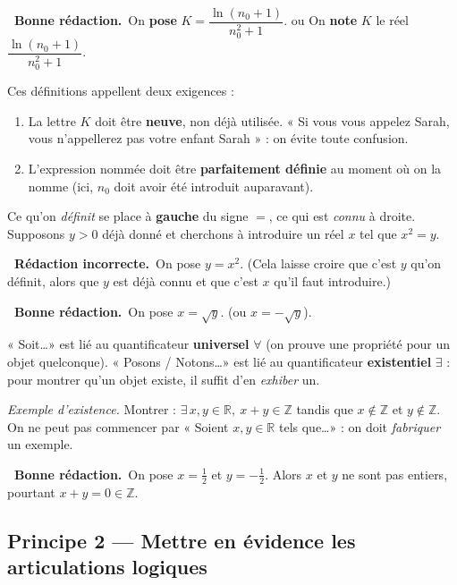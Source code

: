 \documentclass[11pt,a4paper]{article}
\newcommand{\ok}{\textcolor{METeal}{\textbf{\ding{51}\ \sffamily Bonne rédaction.}}\ }
\newcommand{\ko}{\textcolor{MECoral}{\textbf{\ding{55}\ \sffamily Rédaction incorrecte.}}\ }
\newcommand{\R}{\mathbb{R}}
\newcommand{\Z}{\mathbb{Z}}
\begin{document}
\begin{bonne}
\ok On \textbf{pose} $K=\dfrac{\ln(n_0+1)}{n_0^2+1}$. \qquad ou \qquad
On \textbf{note} $K$ le réel $\dfrac{\ln(n_0+1)}{n_0^2+1}$.
\end{bonne}

Ces définitions appellent deux exigences :
\begin{enumerate}
  \item La lettre $K$ doit être \textbf{neuve}, non déjà utilisée. « Si vous vous appelez
  Sarah, vous n'appellerez pas votre enfant Sarah » : on évite toute confusion.
  \item L'expression nommée doit être \textbf{parfaitement définie} au moment où on la nomme
  (ici, $n_0$ doit avoir été introduit auparavant).
\end{enumerate}

\begin{attention}
Ce qu'on \emph{définit} se place à \textbf{gauche} du signe $=$, ce qui est \emph{connu} à
droite. Supposons $y>0$ déjà donné et cherchons à introduire un réel $x$ tel que $x^2=y$.
\begin{mauvaise}
\ko On pose $y=x^2$. \quad(Cela laisse croire que c'est $y$ qu'on définit, alors que $y$ est
déjà connu et que c'est $x$ qu'il faut introduire.)
\end{mauvaise}
\begin{bonne}
\ok On pose $x=\sqrt{y}$. \qquad (ou $x=-\sqrt{y}$).
\end{bonne}
\end{attention}

\begin{remarque}
« Soit\dots » est lié au quantificateur \textbf{universel} $\forall$ (on prouve une propriété
pour un objet quelconque). « Posons / Notons\dots » est lié au quantificateur
\textbf{existentiel} $\exists$ : pour montrer qu'un objet existe, il suffit d'en
\emph{exhiber} un.
\end{remarque}

\emph{Exemple d'existence.} Montrer : $\exists\,x,y\in\R,\ x+y\in\Z$ tandis que
$x\notin\Z$ et $y\notin\Z$. On ne peut pas commencer par « Soient $x,y\in\R$ tels que\dots » :
on doit \emph{fabriquer} un exemple.
\begin{bonne}
\ok On pose $x=\tfrac12$ et $y=-\tfrac12$. Alors $x$ et $y$ ne sont pas entiers, pourtant
$x+y=0\in\Z$.
\end{bonne}

\subsection{Principe 2 — Mettre en évidence les articulations logiques}
\end{document}
